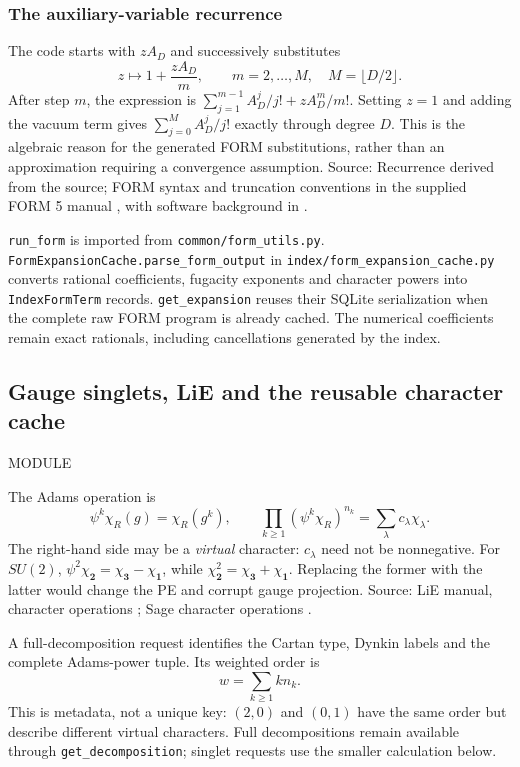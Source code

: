 \documentclass[11pt,a4paper]{article}
\numberwithin{equation}{section}
\newcommand{\code}[1]{{\small\nolinkurl{#1}}}
\newcommand{\file}[1]{\par{\small\sffamily\color{muted}MODULE \quad\texttt{\detokenize{#1}}}\par}
\newcommand{\src}[1]{{\small\color{muted}Source: #1.}\par}
\begin{document}
\subsubsection{The auxiliary-variable recurrence}
The code starts with $zA_D$ and successively substitutes
\begin{equation}
 z\longmapsto1+\frac{zA_D}{m},\qquad m=2,\ldots,M,
 \quad M=\lfloor D/2\rfloor.
 \label{eq:exp-recursion}
\end{equation}
After step $m$, the expression is
$\sum_{j=1}^{m-1}A_D^j/j!+zA_D^m/m!$. Setting $z=1$ and adding the vacuum
term gives $\sum_{j=0}^{M}A_D^j/j!$ exactly through degree $D$.
This is the algebraic reason for the generated FORM substitutions, rather than
an approximation requiring a convergence assumption.
\src{Recurrence derived from the source; FORM syntax and truncation conventions
in the supplied FORM 5 manual \cite{form5}, with software background in \cite{form4}}

\code{run_form} is imported from \code{common/form_utils.py}.
\code{FormExpansionCache.parse_form_output} in \code{index/form_expansion_cache.py}
converts rational coefficients, fugacity exponents and character powers into
\code{IndexFormTerm} records. \code{get_expansion} reuses their SQLite serialization
when the complete raw FORM program is already cached. The numerical coefficients remain
exact rationals, including cancellations generated by the index.

\clearpage
\subsection{Gauge singlets, LiE and the reusable character cache}
\file{index/char_decomposition_cache.py}
The Adams operation is
\begin{equation}
 \psi^k\chi_R(g)=\chi_R(g^k),\qquad
 \prod_{k\geq1}(\psi^k\chi_R)^{n_k}
 =\sum_\lambda c_\lambda\chi_\lambda.
 \label{eq:adams}
\end{equation}
The right-hand side may be a \emph{virtual} character: $c_\lambda$ need not be
nonnegative. For $SU(2)$,
$\psi^2\chi_{\mathbf2}=\chi_{\mathbf3}-\chi_{\mathbf1}$, while
$\chi_{\mathbf2}^2=\chi_{\mathbf3}+\chi_{\mathbf1}$. Replacing the former with
the latter would change the PE and corrupt gauge projection.
\src{LiE manual, character operations \cite{lie}; Sage character operations
\cite{sage-chars}}

A full-decomposition request identifies the Cartan type, Dynkin labels and the
complete Adams-power tuple. Its weighted order is
\begin{equation}
 w=\sum_{k\geq1}k n_k.
 \label{eq:adams-order}
\end{equation}
This is metadata, not a unique key: $(2,0)$ and $(0,1)$ have the same order but
describe different virtual characters. Full decompositions remain available
through \code{get_decomposition}; singlet requests use the smaller calculation below.
\end{document}
